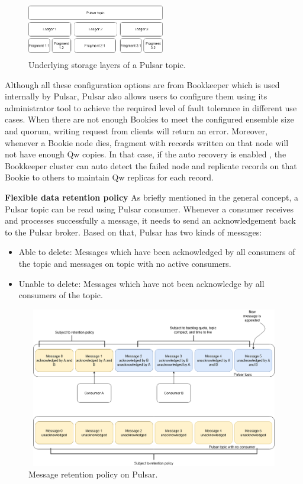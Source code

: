 \begin{figure}[h]
	\centering
	\includegraphics[width=6cm,height=2.5cm]{images/pulsar-topic.png}
	\caption{Underlying storage layers of a Pulsar topic.}
	\label{fig:pulsartopic}
\end{figure}
Although all these configuration options are from Bookkeeper which is used internally by Pulsar, Pulsar also allows users to configure them using its administrator tool to achieve the required level of fault tolerance in different use cases. When there are not enough Bookies to meet the configured ensemble size and quorum, writing request from clients will return an error. Moreover, whenever a Bookie node dies, fragment with records written on that node will not have enough Qw copies. In that case, if the auto recovery is enabled \cite{bookkeeperadmin}, the Bookkeeper cluster can auto detect the failed node and replicate records on that Bookie to others to maintain Qw replicas for each record.  

\textbf{Flexible data retention policy}
As briefly mentioned in the general concept, a Pulsar topic can be read using Pulsar consumer. Whenever a consumer receives and processes successfully a message, it needs to send an acknowledgement back to the Pulsar broker. Based on that, Pulsar has two kinds of messages:
\begin{itemize}
	\item Able to delete: Messages which have been acknowledged by all consumers of the topic and messages on topic with no active consumers.
	\item Unable to delete: Messages which have not been acknowledge by all consumers of the topic.
\end{itemize}

\begin{figure}[h]
	\centering
	\includegraphics[width=12cm,height=7cm]{images/pulsar-retention.png}
	\caption{Message retention policy on Pulsar.}
	\label{fig:pulsarretention}
\end{figure}

